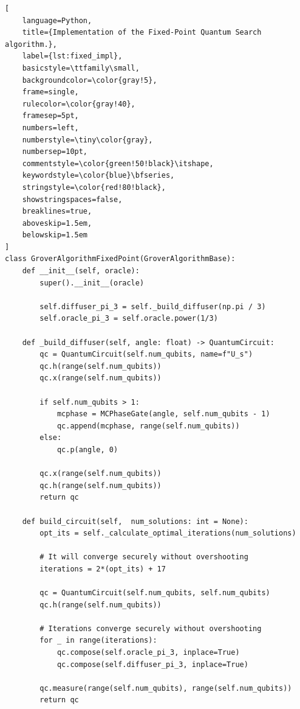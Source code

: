 \begin{lstlisting}[
    language=Python, 
    title={Implementation of the Fixed-Point Quantum Search algorithm.}, 
    label={lst:fixed_impl},              
    basicstyle=\ttfamily\small,    
    backgroundcolor=\color{gray!5},
    frame=single, 
    rulecolor=\color{gray!40},     
    framesep=5pt,                 
    numbers=left, 
    numberstyle=\tiny\color{gray}, 
    numbersep=10pt,                
    commentstyle=\color{green!50!black}\itshape, 
    keywordstyle=\color{blue}\bfseries, 
    stringstyle=\color{red!80!black},
    showstringspaces=false,
    breaklines=true,
    aboveskip=1.5em,              
    belowskip=1.5em                
]
class GroverAlgorithmFixedPoint(GroverAlgorithmBase):
    def __init__(self, oracle):
        super().__init__(oracle)

        self.diffuser_pi_3 = self._build_diffuser(np.pi / 3)
        self.oracle_pi_3 = self.oracle.power(1/3)

    def _build_diffuser(self, angle: float) -> QuantumCircuit:
        qc = QuantumCircuit(self.num_qubits, name=f"U_s")
        qc.h(range(self.num_qubits))
        qc.x(range(self.num_qubits))

        if self.num_qubits > 1:
            mcphase = MCPhaseGate(angle, self.num_qubits - 1)
            qc.append(mcphase, range(self.num_qubits))
        else:
            qc.p(angle, 0)

        qc.x(range(self.num_qubits))
        qc.h(range(self.num_qubits))
        return qc

    def build_circuit(self,  num_solutions: int = None):
        opt_its = self._calculate_optimal_iterations(num_solutions)

        # It will converge securely without overshooting
        iterations = 2*(opt_its) + 17

        qc = QuantumCircuit(self.num_qubits, self.num_qubits)
        qc.h(range(self.num_qubits))

        # Iterations converge securely without overshooting
        for _ in range(iterations):
            qc.compose(self.oracle_pi_3, inplace=True)
            qc.compose(self.diffuser_pi_3, inplace=True)

        qc.measure(range(self.num_qubits), range(self.num_qubits))
        return qc
\end{lstlisting}